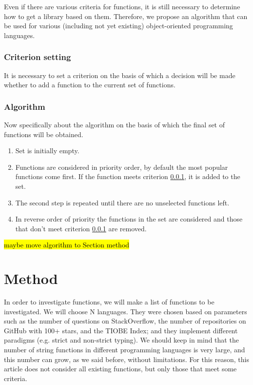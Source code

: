 \documentclass[anonymous,sigplan,review,11pt,nonacm,natbib=false]{acmart}
\begin{document}
    Even if there are various criteria for functions, it is still necessary to determine how to get a library based on them. Therefore, we propose an algorithm that can be used for various (including not yet existing) object-oriented programming languages.

    \subsubsection{Criterion setting}

    \label{criterion}

    It is necessary to set a criterion on the basis of which a decision will be made whether to add a function to the current set of functions.

    \subsubsection{Algorithm}

    Now specifically about the algorithm on the basis of which the final set of functions will be obtained.

    \begin{enumerate}
        \item Set is initially empty.
        \item Functions are considered in priority order, by default the most popular functions come first. If the function meets criterion \ref{criterion}, it is added to the set.
        \item The second step is repeated until there are no unselected functions left.
        \item In reverse order of priority the functions in the set are considered and those that don't meet criterion \ref{criterion} are removed.
    \end{enumerate}

    \hl{maybe move algorithm to Section method}

    \section{Method}

    In order to investigate functions, we will make a list of functions to be investigated. We will choose N languages. They were chosen based on parameters such as the number of questions on StackOverflow, the number of repositories on GitHub with 100+ stars, and the TIOBE Index; and they implement different paradigms (e.g. strict and non-strict typing).
    We should keep in mind that the number of string functions in different programming languages is very large, and this number can grow, as we said before, without limitations. For this reason, this article does not consider all existing functions, but only those that meet some criteria.
\end{document}
